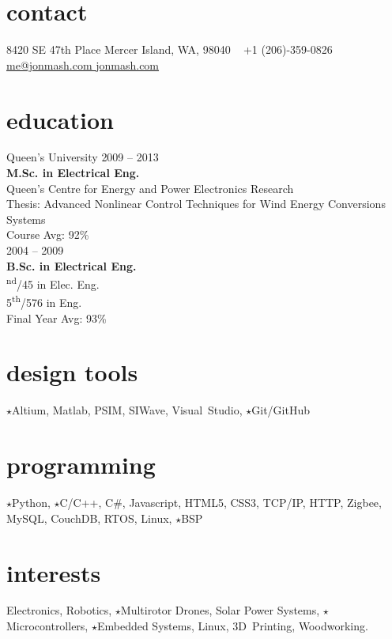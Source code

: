 
\begin{aside}
%
\section{contact}
8420 SE 47th Place
Mercer Island, WA, 98040
~
+1 (206)-359-0826
~
\href{mailto:me@jonmash.com}{me@jonmash.com \faEnvelope}
\href{http://www.jonmash.com}{jonmash.com \faLink}
%
\section{education}
\restorecr
{\headingfont Queen's University}
{2009 -- 2013} \\
\textbf{M.Sc. {\normalfont in Electrical Eng.}}\\
{\bodyfontit Queen’s Centre for Energy and Power Electronics Research}\\
Thesis: Advanced Nonlinear Control Techniques for Wind Energy Conversions Systems\\
Course Avg: 92\%\\
\vspace{0.3cm}
{2004 -- 2009} \\
\textbf{B.Sc. {\normalfont in Electrical Eng.}}\\
{\textsuperscript{nd}/45 in Elec. Eng. \\ 5\textsuperscript{th}/576 in Eng.}\\
Final Year Avg: 93\%\\
%
\section{design tools}
{\color{orange} $\star$}Altium, Matlab, PSIM, SIWave, Visual~Studio, {\color{orange} $\star$}Git/GitHub
%
\section{programming}
{\color{orange} $\star$}Python, {\color{orange} $\star$}C/C++, C\#, 
Javascript, HTML5, CSS3, 
TCP/IP, HTTP, Zigbee, 
MySQL, CouchDB, 
RTOS, Linux, {\color{orange} $\star$}BSP
%
\section{interests}
Electronics, Robotics, {\color{orange} $\star$}Multirotor Drones, Solar Power Systems, {\color{orange} $\star$}Microcontrollers, {\color{orange} $\star$}Embedded Systems, Linux, 3D~Printing, Woodworking.
\obeycr
\end{aside}